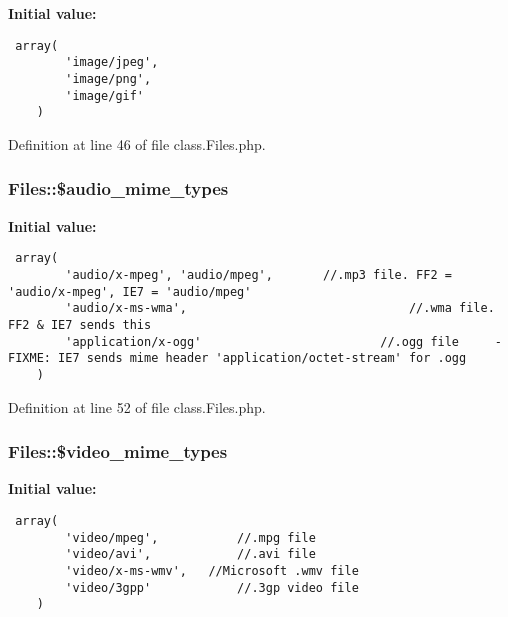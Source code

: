 \textbf{Initial value:}

\begin{Code}\begin{verbatim} array(
        'image/jpeg',
        'image/png',
        'image/gif'
    )
\end{verbatim}
\end{Code}


Definition at line 46 of file class.Files.php.
\subsubsection{\setlength{\rightskip}{0pt plus 5cm}Files::\$audio\_\-mime\_\-types}\label{classFiles_9847461d625604e4ac2ed8f8897a4bb5}


\textbf{Initial value:}

\begin{Code}\begin{verbatim} array(
        'audio/x-mpeg', 'audio/mpeg',       //.mp3 file. FF2 = 'audio/x-mpeg', IE7 = 'audio/mpeg'
        'audio/x-ms-wma',                               //.wma file. FF2 & IE7 sends this
        'application/x-ogg'                         //.ogg file     - FIXME: IE7 sends mime header 'application/octet-stream' for .ogg
    )
\end{verbatim}
\end{Code}


Definition at line 52 of file class.Files.php.
\subsubsection{\setlength{\rightskip}{0pt plus 5cm}Files::\$video\_\-mime\_\-types}\label{classFiles_e0a193e653707182715f17ad99e69797}


\textbf{Initial value:}

\begin{Code}\begin{verbatim} array(
        'video/mpeg',           //.mpg file
        'video/avi',            //.avi file
        'video/x-ms-wmv',   //Microsoft .wmv file
        'video/3gpp'            //.3gp video file
    )
\end{verbatim}
\end{Code}


